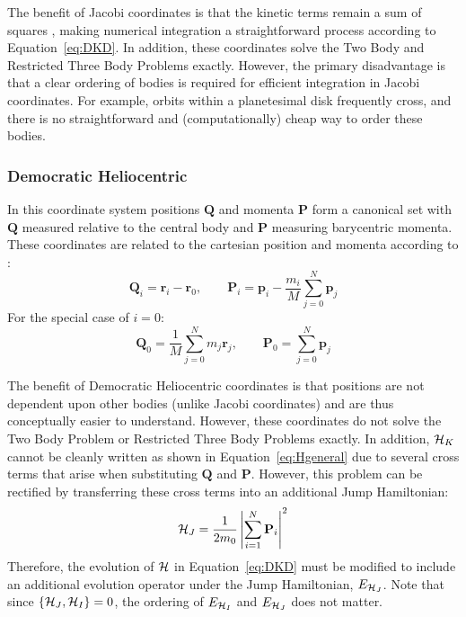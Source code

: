 The benefit of Jacobi coordinates is that the kinetic terms remain a sum of squares \citep{Plummer1918}, making numerical integration a straightforward process according to Equation~\ref{eq:DKD}. 
In addition, these coordinates solve the Two Body and Restricted Three Body Problems exactly. 
However, the primary disadvantage is that a clear ordering of bodies is required for efficient integration in Jacobi coordinates. 
For example, orbits within a planetesimal disk frequently cross, and there is no straightforward and (computationally) cheap way to order these bodies. 

\subsubsection{Democratic Heliocentric}
\label{sec:DH}
In this coordinate system positions $\textbf{Q}$ and momenta $\textbf{P}$ form a canonical set with $\textbf{Q}$ measured relative to the central body and $\textbf{P}$ measuring barycentric momenta.
These coordinates are related to the cartesian position and momenta according to \citep{Duncan1998}:
\begin{equation}
\textbf{Q}_i = \textbf{r}_i - \textbf{r}_0, \qquad
\textbf{P}_i = \textbf{p}_i - \frac{m_i}{M}\sum_{j=0}^N \textbf{p}_j
\end{equation}
For the special case of $i=0$:
\begin{equation}
\textbf{Q}_0 = \frac{1}{M} \sum_{j=0}^N m_j \textbf{r}_j, \qquad
\textbf{P}_0 = \sum_{j=0}^{N} \textbf{p}_j
\end{equation}

The benefit of Democratic Heliocentric coordinates is that positions are not dependent upon other bodies (unlike Jacobi coordinates) and are thus conceptually easier to understand. 
However, these coordinates do not solve the Two Body Problem or Restricted Three Body Problems exactly. 
In addition, $\mathcal{H}_K$ cannot be cleanly written as shown in Equation~\ref{eq:Hgeneral} due to several cross terms that arise when substituting $\textbf{Q}$ and \textbf{P}.
However, this problem can be rectified by transferring these cross terms into an additional Jump Hamiltonian:
\begin{equation}
\mathcal{H}_J = \frac{1}{2m_0} \left|\sum_{i=1}^N \textbf{P}_i\right|^2
\end{equation}
Therefore, the evolution of $\mathcal{H}$ in Equation~\ref{eq:DKD} must be modified to include an additional evolution operator under the Jump Hamiltonian, $E_{\mathcal{H}_J}$.
Note that since $\{\mathcal{H}_J, \mathcal{H}_I\} = 0$, the ordering of $E_{\mathcal{H}_I}$ and $E_{\mathcal{H}_J}$ does not matter. 

